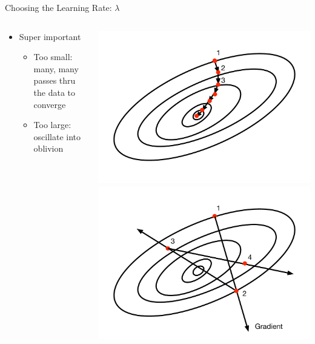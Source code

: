 \documentclass[aspectratio=169]{beamer}
\begin{document}
\begin{frame}[fragile]{Choosing the Learning Rate: $\lambda$}

\begin{columns}[c]
\begin{column}{0.4\textwidth}
\begin{itemize}
\item Super important
	\begin{itemize}
	\item Too small: many, many passes thru the data to converge
	\item Too large: oscillate into oblivion
	\end{itemize}
\end{itemize}
\end{column}
\begin{column}{0.3\textwidth}
\includegraphics[width=1\textwidth]{lectGD/tooSmall.pdf}\\
\includegraphics[width=1\textwidth]{lectGD/tooBig.pdf}\\

\end{column}
\end{columns}
\end{frame}
\end{document}
